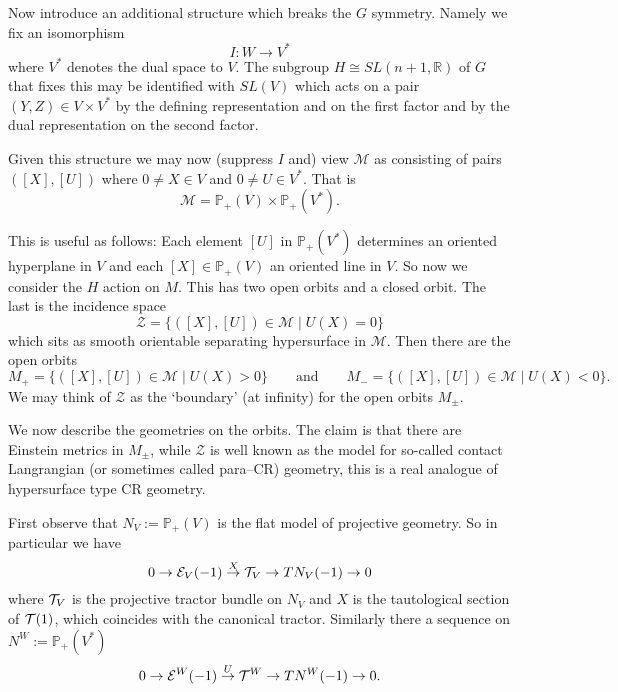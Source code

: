 Now introduce an additional structure which breaks the $G$
symmetry. 
Namely we fix an isomorphism
$$
I:W\to V^*
$$
where $V^*$ denotes the dual space to $V$. The subgroup $H\cong SL(n+1,\mathbb{R})$ of $G$
that fixes this may be identified with $SL(V)$ which acts on a pair
$(Y,Z)\in V\times V^*$ by the defining representation and on the first
factor and by the dual representation on the second factor.

Given this structure we may now (suppress $I$ and) view ${\mathcal{M}}$ as
consisting of pairs $([X],[U])$ where $0\neq X\in V$ and $0\neq U\in
V^*$. That is 
$$
{\mathcal{M}}= \mathbb{P}_+(V) \times \mathbb{P}_+(V^*).
$$

This is useful as follows: Each element $[U]$ in
$\mathbb{P}_+(V^*)$ determines an oriented  hyperplane in $V$ and each $[X]\in
\mathbb{P}_+(V)$ an oriented line in $V$.  So now we consider the $H$
action on $M$. This has two open orbits and a closed orbit. The last
is the incidence space 
$$
\mathcal{Z}=\{ ([X],[U])\in \mathcal{M} \mid U(X)=0 \} 
$$
which sits as smooth orientable separating hypersurface in $\mathcal{M}$. Then there are the open orbits
$$
M_+=\{ ([X],[U])\in \mathcal{M} \mid U(X)>0 \} \qquad \mbox{and} \qquad
M_-=\{ ([X],[U])\in \mathcal{M} \mid U(X)<0 \}.
$$
We may think of $\mathcal{Z}$ as the `boundary' (at infinity) for the open orbits $M_\pm$.

We now describe the geometries on the orbits. The claim is that there
are Einstein metrics in $M_\pm$, while $\mathcal{Z}$ is well known as
the model for so-called contact Langrangian (or sometimes called
para--CR) geometry, this is a real analogue of hypersurface type CR
geometry.

First observe that $N_V:=\mathbb{P}_+(V)$
is the flat model of projective
geometry. So in particular we have
$$
0\to \mathcal{E}_V(-1)\stackrel{X}{\to}\mathcal{T}_V\to TN_V(-1)\to 0
$$
where $\mathcal{T}_V$ is the projective tractor bundle on $N_V$ and $X$ is the
tautological section of $\mathcal{T}(1)$, which coincides with the canonical tractor.
Similarly there a sequence on
$N^W:= \mathbb{P}_+(V^*)$
\begin{equation}\label{useful}
0\to \mathcal{E}^W(-1)\stackrel{U}{\to}\mathcal{T}^W \to TN^W(-1)\to 0 .
\end{equation}

